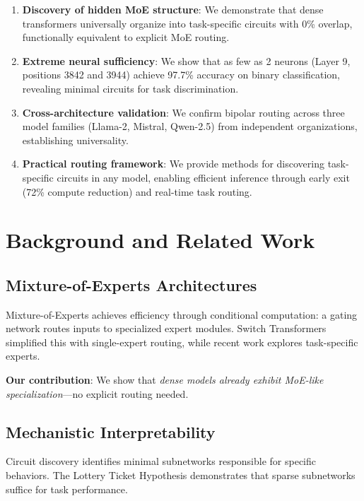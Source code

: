 \documentclass{article}
\begin{document}
\begin{enumerate}
    \item \textbf{Discovery of hidden MoE structure}: We demonstrate that dense transformers universally organize into task-specific circuits with 0\% overlap, functionally equivalent to explicit MoE routing.
    
    \item \textbf{Extreme neural sufficiency}: We show that as few as 2 neurons (Layer 9, positions 3842 and 3944) achieve 97.7\% accuracy on binary classification, revealing minimal circuits for task discrimination.
    
    \item \textbf{Cross-architecture validation}: We confirm bipolar routing across three model families (Llama-2, Mistral, Qwen-2.5) from independent organizations, establishing universality.
    
    \item \textbf{Practical routing framework}: We provide methods for discovering task-specific circuits in any model, enabling efficient inference through early exit (72\% compute reduction) and real-time task routing.
\end{enumerate}

\section{Background and Related Work}

\subsection{Mixture-of-Experts Architectures}

Mixture-of-Experts \cite{jacobs1991adaptive,shazeer2017outrageously} achieves efficiency through conditional computation: a gating network routes inputs to specialized expert modules. Switch Transformers \cite{fedus2022switch} simplified this with single-expert routing, while recent work explores task-specific experts.

\textbf{Our contribution}: We show that \textit{dense models already exhibit MoE-like specialization}—no explicit routing needed.

\subsection{Mechanistic Interpretability}

Circuit discovery \cite{olah2020zoom,elhage2021mathematical,cammarata2020curve} identifies minimal subnetworks responsible for specific behaviors. The Lottery Ticket Hypothesis \cite{frankle2019lottery} demonstrates that sparse subnetworks suffice for task performance.
\end{document}
